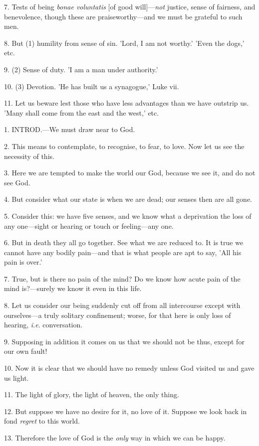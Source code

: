 7. Tests of being \emph{bonae voluntatis} [of
good will]—\emph{not} justice, sense of fairness, and benevolence,
though these are praiseworthy—and we must be grateful to such men.

8. But (1) humility from sense of sin. 'Lord, I
am not worthy.' 'Even the dogs,' etc.

9. (2) Sense of duty. 'I am a man under
authority.'

10. (3) Devotion. 'He has built us a synagogue,'
Luke vii.

11. Let us beware lest those who have less
advantages than we have outstrip us. 'Many shall come from the east
and the west,' etc.


1. INTROD.—We
must draw near to God.

2. This means to contemplate, to recognise, to
fear, to love. Now let us see the necessity of this.

3. Here we are tempted to make the world our God,
because we see it, and do not see God.

4. But consider what our state is when we are
dead; our senses then are all gone.

5. Consider this: we have five senses, and we
know what a deprivation the loss of any one—sight or hearing or
touch or feeling—any one.

6. But in death they all go together. See what we
are reduced to. It is true we cannot have any bodily pain—and that
is what people are apt to say, 'All his pain is over.'

7. True, but is there no pain of the mind? Do
we know how acute pain of the mind is?—surely we know it even
in this life.

8. Let us consider our being suddenly cut off
from all intercourse except with ourselves—a truly solitary
confinement; worse, for that here is only loss of hearing, \emph{i.e}.
conversation.

9. Supposing in addition it comes on us that we
should not be thus, except for our own fault!

10. Now it is clear that we should have no remedy
unless God visited us and gave us light.

11. The light of glory, the light of heaven, the
only thing.

12. But suppose we have no desire for it, no love
of it. Suppose we look back in fond \emph{regret} to this world.

13. Therefore the love of God is the \emph{only}
way in which we can be happy.

